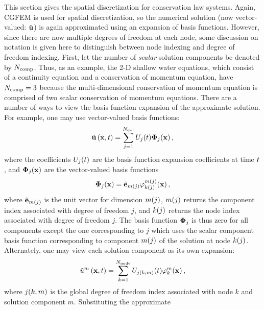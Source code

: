 This section gives the spatial discretization for conservation law systems.
Again, CGFEM is used for
spatial discretization, so the numerical solution (now vector-valued:
$\tilde{\mathbf{u}}$) is again approximated using an expansion of basis
functions. However, since there are now multiple degrees of freedom at each
node, some discussion on notation is given here to distinguish between node
indexing and degree of freedom indexing.  First, let the number of
\emph{scalar} solution components be denoted by $N_\text{comp}$.  Thus, as an
example, the 2-D shallow water equations, which consist of a continuity
equation and a conservation of momentum equation, have $N_\text{comp}=3$ because
the multi-dimensional conservation of momentum equation is comprised of two
scalar conservation of momentum equations.  There are a number of ways to view
the basis function expansion of the approximate solution. For example, one may
use vector-valued basis functions:
\begin{equation}
  \tilde{\mathbf{u}}\left(\mathbf{x},t\right) = \sum\limits_{j=1}^{N_\text{dof}}
    U_j(t)\mathbf{\Phi}_j(\mathbf{x}) \,,
\end{equation}
where the coefficients $U_j(t)$ are the basis function
expansion coefficients at time $t$, and $\mathbf{\Phi}_j(\mathbf{x})$
are the vector-valued basis functions
\begin{equation}
  \mathbf{\Phi}_j(\mathbf{x}) = 
    \hat{\mathbf{e}}_{m(j)}
      \varphi^{m(j)}_{k(j)}(\mathbf{x})
  \,,
\end{equation}
where $\hat{\mathbf{e}}_{m(j)}$ is the unit vector for dimension
$m(j)$, $m(j)$ returns the component index associated with degree
of freedom $j$, and $k(j)$ returns the node index associated with
degree of freedom $j$. The basis function $\mathbf{\Phi}_j$ is thus
zero for all components except the one corresponding to $j$ which uses
the scalar component basis function corresponding to component $m(j)$ of
the solution at node $k(j)$.
Alternately, one may view each solution component as its own expansion:
\begin{equation}
  \tilde{u}^m\left(\mathbf{x},t\right) = \sum\limits_{k=1}^{N_\text{node}}
    U_{j(k,m)}(t)\varphi^m_k(\mathbf{x})
  \,,
\end{equation}
where $j(k,m)$ is the global degree of freedom index associated
with node $k$ and solution component $m$.
Substituting the approximate
